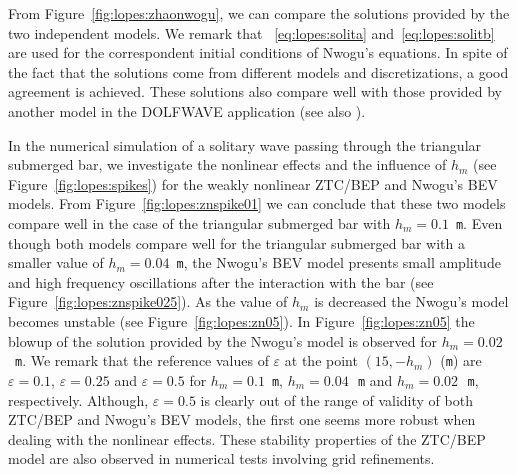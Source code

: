 From Figure~\ref{fig:lopes:zhaonwogu}, we can compare the solutions
provided by the two independent models.  We remark that
~\eqref{eq:lopes:solita} and~\eqref{eq:lopes:solitb} are used for the
correspondent initial conditions of Nwogu's equations.  In spite of
the fact that the solutions come from different models and
discretizations, a good agreement is achieved.  These solutions also
compare well with those provided by another model in the DOLFWAVE
application (see also ).



In the numerical simulation of a solitary wave passing through the
triangular submerged bar, we investigate the nonlinear effects and the
influence of $h_m$ (see Figure~\ref{fig:lopes:spikes}) for the weakly
nonlinear ZTC/BEP and Nwogu's BEV models.  From
Figure~\ref{fig:lopes:znspike01} we can conclude that these two models
compare well in the case of the triangular submerged bar with
$h_m=0.1$~{\tt m}.  Even though both models compare well for the
triangular submerged bar with a smaller value of $h_m=0.04$~{\tt m},
the Nwogu's BEV model presents small amplitude and high frequency
oscillations after the interaction with the bar (see
Figure~\ref{fig:lopes:znspike025}).  As the value of $h_m$ is
decreased the Nwogu's model becomes unstable (see
Figure~\ref{fig:lopes:zn05}).  In Figure~\ref{fig:lopes:zn05} the
blowup of the solution provided by the Nwogu's model is observed for
$h_m=0.02$~{\tt m}.  We remark that the reference values of
$\varepsilon$ at the point $(15,-h_m)$ ({\tt m}) are
$\varepsilon=0.1$, $\varepsilon=0.25$ and $\varepsilon=0.5$ for
$h_m=0.1$~{\tt m}, $h_m=0.04$\,~{\tt m} and $h_m=0.02$\,~{\tt m},
respectively. Although, $\varepsilon=0.5$ is clearly out of the range
of validity of both ZTC/BEP and Nwogu's BEV models, the first one
seems more robust when dealing with the nonlinear effects. These
stability properties of the ZTC/BEP model are also observed in
numerical tests involving grid refinements.

